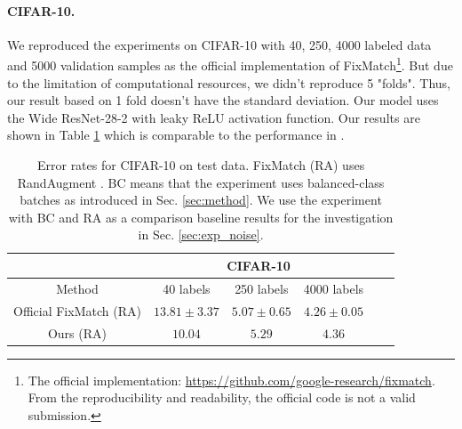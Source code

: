 \paragraph{CIFAR-10.}
We reproduced the experiments on CIFAR-10 with 40, 250, 4000 labeled data and 5000 validation samples as the official implementation of FixMatch\footnote{The official implementation: \url{https://github.com/google-research/fixmatch}. From the reproducibility and readability, the official code is not a valid submission.}.  But due to the limitation of computational resources, we didn't reproduce 5 "folds". Thus, our result based on 1 fold doesn't have the standard deviation. Our model uses the Wide ResNet-28-2 \citep{zagoruyko2016wide} with leaky ReLU activation function. 
Our results are shown in Table \ref{tab:err} which is comparable to the performance in \citep{sohn2020fixmatch}.

\begin{table}[h]
\centering
\small
\caption{ Error rates for CIFAR-10 on test data. FixMatch (RA) uses RandAugment \citep{cubuk2020randaugment}. BC means that the experiment uses balanced-class batches as introduced in Sec. \ref{sec:method}. We use the experiment with BC and RA as a comparison baseline results for the investigation in Sec. \ref{sec:exp_noise}. 
} \label{tab:err}
\begin{tabular}{cccccc}
\hline
              & \multicolumn{3}{c}{CIFAR-10} \\ \hline
Method        & 40 labels     & 250 labels     & 4000 labels     \\ \hline
Official FixMatch (RA) & $13.81 \pm 3.37$      & $5.07\pm 0.65$        &     $4.26\pm 0.05$     \\ 
Ours (RA) & $10.04$     & $5.29$        &     $4.36$     \\ 
\hline
\end{tabular}
\end{table}

